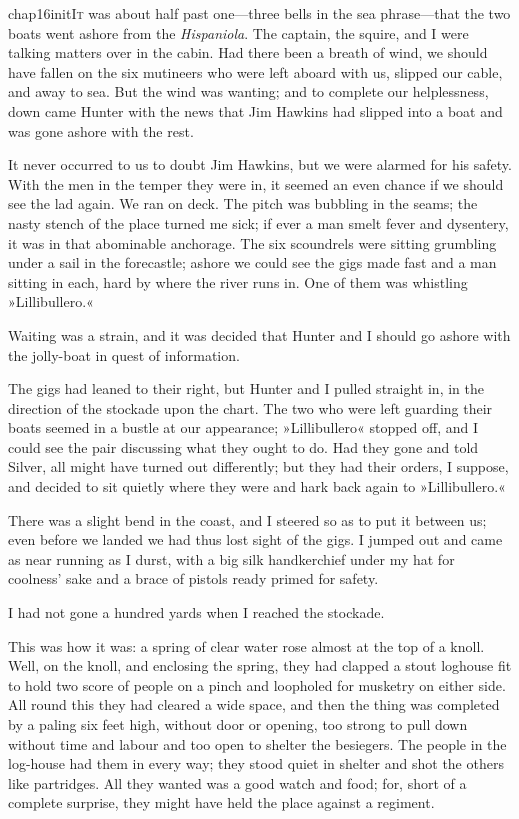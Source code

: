 
   \lettrine[lines=4,image=true]{chap16initI}{t} was about half past one—three bells in the sea phrase—that the two boats went ashore from the \textit{Hispaniola}. The captain, the squire, and I were talking matters over in the cabin. Had there been a breath of wind, we should have fallen on the six mutineers who were left aboard with us, slipped our cable, and away to sea. But the wind was wanting; and to complete our helplessness, down came Hunter with the news that Jim Hawkins had slipped into a boat and was gone ashore with the rest.

It never occurred to us to doubt Jim Hawkins, but we were alarmed for his safety. With the men in the temper they were in, it seemed an even chance if we should see the lad again. We ran on deck. The pitch was bubbling in the seams; the nasty stench of the place turned me sick; if ever a man smelt fever and dysentery, it was in that abominable anchorage. The six scoundrels were sitting grumbling under a sail in the forecastle; ashore we could see the gigs made fast and a man sitting in each, hard by where the river runs in. One of them was whistling »Lillibullero.«

Waiting was a strain, and it was decided that Hunter and I should go ashore with the jolly-boat in quest of information.

The gigs had leaned to their right, but Hunter and I pulled straight in, in the direction of the stockade upon the chart. The two who were left guarding their boats seemed in a bustle at our appearance; »Lillibullero« stopped off, and I could see the pair discussing what they ought to do. Had they gone and told Silver, all might have turned out differently; but they had their orders, I suppose, and decided to sit quietly where they were and hark back again to »Lillibullero.«

There was a slight bend in the coast, and I steered so as to put it between us; even before we landed we had thus lost sight of the gigs. I jumped out and came as near running as I durst, with a big silk handkerchief under my hat for coolness' sake and a brace of pistols ready primed for safety.

I had not gone a hundred yards when I reached the stockade.

This was how it was: a spring of clear water rose almost at the top of a knoll. Well, on the knoll, and enclosing the spring, they had clapped a stout loghouse fit to hold two score of people on a pinch and loopholed for musketry on either side. All round this they had cleared a wide space, and then the thing was completed by a paling six feet high, without door or opening, too strong to pull down without time and labour and too open to shelter the besiegers. The people in the log-house had them in every way; they stood quiet in shelter and shot the others like partridges. All they wanted was a good watch and food; for, short of a complete surprise, they might have held the place against a regiment.

